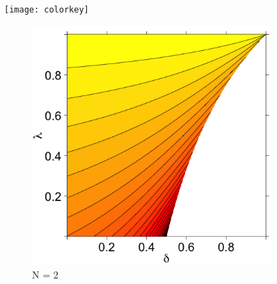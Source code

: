 \documentclass[11pt]{article}
\theoremstyle{definition}
\theoremstyle{definition}
\begin{document}
\begin{figure}
\centering
\hspace*{1.2em} 	\texttt{[image: colorkey]} %

        \centering
        \begin{subfigure}[b]{0.49\textwidth}
                \includegraphics[width=\textwidth]{ExtremeN2}
\caption{N = 2}	
\label{ExtremeN2}
        \end{subfigure}%
        ~ %
        ~ %
        \begin{subfigure}[b]{0.49\textwidth}

\end{subfigure}
\end{figure}
\end{document}
